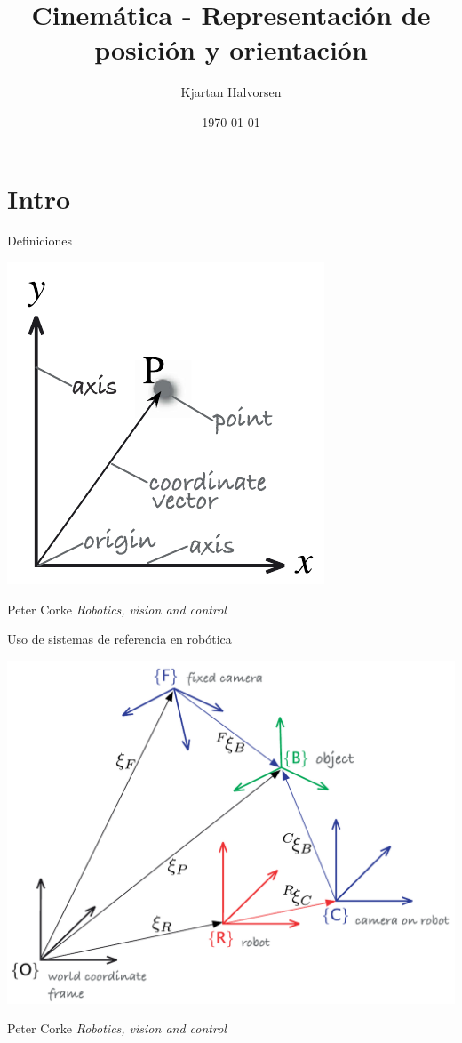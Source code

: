 \documentclass[presentation,aspectratio=169]{beamer}
\author{Kjartan Halvorsen}
\date{\today}
\title{Cinemática - Representación de posición y orientación}
\begin{document}
\maketitle

\section{Intro}
\label{sec:org513471b}
\begin{frame}[label={sec:org376904c}]{Definiciones}
\begin{center}
\includegraphics[height=0.5\textheight]{../figures/Corke-fig2.1.a.png}

\footnotesize Peter Corke \emph{Robotics, vision and control}
\end{center}
\end{frame}


\begin{frame}[label={sec:orgc1c60fc}]{Uso de sistemas de referencia en robótica}
\begin{center}
\includegraphics[height=0.5\textheight]{../figures/Corke-fig2.4.png}

\footnotesize Peter Corke \emph{Robotics, vision and control}
\end{center}
\end{frame}
\end{document}
